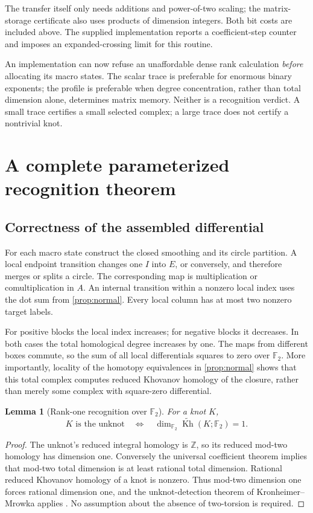 \documentclass[11pt,letterpaper]{article}
\newtheorem{lemma}[theorem]{Lemma}
\theoremstyle{definition}
\newcommand{\F}{\mathbb F_2}
\newcommand{\Z}{\mathbb Z}
\newcommand{\rKh}{\widetilde{\operatorname{Kh}}}
\begin{document}
The transfer itself only needs additions and power-of-two scaling; the matrix-storage certificate also uses products of dimension integers. Both bit costs are included above. The supplied implementation reports a coefficient-step counter and imposes an expanded-crossing limit for this routine.

An implementation can now refuse an unaffordable dense rank calculation \emph{before} allocating its macro states. The scalar trace is preferable for enormous binary exponents; the profile is preferable when degree concentration, rather than total dimension alone, determines matrix memory. Neither is a recognition verdict. A small trace certifies a small selected complex; a large trace does not certify a nontrivial knot.

\section{A complete parameterized recognition theorem}\label{sec:complexity}
\subsection{Correctness of the assembled differential}
For each macro state construct the closed smoothing and its circle partition. A local endpoint transition changes one \(I\) into \(E\), or conversely, and therefore merges or splits a circle. The corresponding map is multiplication or comultiplication in \(A\). An internal transition within a nonzero local index uses the dot sum from \cref{prop:normal}. Every local column has at most two nonzero target labels.

For positive blocks the local index increases; for negative blocks it decreases. In both cases the total homological degree increases by one. The maps from different boxes commute, so the sum of all local differentials squares to zero over \(\F\). More importantly, locality of the homotopy equivalences in \cref{prop:normal} shows that this total complex computes reduced Khovanov homology of the closure, rather than merely some complex with square-zero differential.

\begin{lemma}[Rank-one recognition over \(\F\)]\label{lem:detect}
For a knot \(K\),
\[
 K\text{ is the unknot}\quad\Longleftrightarrow\quad
 \dim_{\F}\rKh(K;\F)=1.
\]
\end{lemma}
\begin{proof}
The unknot's reduced integral homology is \(\Z\), so its reduced mod-two homology has dimension one. Conversely the universal coefficient theorem implies that mod-two total dimension is at least rational total dimension. Rational reduced Khovanov homology of a knot is nonzero. Thus mod-two dimension one forces rational dimension one, and the unknot-detection theorem of Kronheimer--Mrowka applies \cite{km}. No assumption about the absence of two-torsion is required.
\end{proof}
\end{document}
